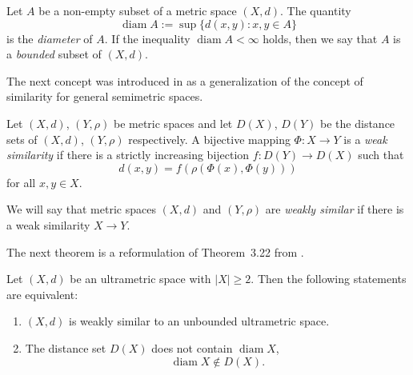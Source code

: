 \documentclass{article}
\begin{document}
Let $A$ be a non-empty subset of a metric space $(X,d)$. The quantity
\begin{equation}\label{lokias}
    \operatorname{diam} A := \sup\{ d(x,y) : x,y \in A \}
\end{equation}
is the \emph{diameter} of $A$. If the inequality $\operatorname{diam} A < \infty$
holds, then we say that $A$ is a \emph{bounded} subset of $(X,d)$.





The next concept was introduced in \cite{DP2013AMH} as a generalization of the concept of similarity for general semimetric spaces.


\begin{Definition}\label{xzsdd}
\label{scguite}
Let $(X, d)$, $(Y, \rho)$ be metric spaces and let $D(X)$, $D(Y)$ be the distance sets of $(X, d)$, $(Y, \rho)$ respectively.
 A bijective mapping $\Phi\colon X \to Y$ is a {\it weak similarity} if there is a strictly increasing bijection $f\colon D(Y) \to D(X)$ such that 
\begin{equation*}
d(x, y) = f \left( \rho \left( \Phi(x), \Phi(y) \right) \right)
\end{equation*}
for all $x, y \in X$.
\end{Definition}


We will say that metric spaces $(X,d)$ and $(Y,\rho)$ are \emph{weakly similar} if there is a weak similarity $
X \to Y $.



The next theorem is a reformulation of Theorem~3.22 from \cite{BDK2022TAG}.



\begin{Theorem}\label{rgjkjs24}
Let $(X,d)$ be an ultrametric space with $|X|\geq 2.$ Then the following statements are equivalent:
 \begin{enumerate}[label=\textit{(\roman*)}, left=0pt]
     \item $ (X,d)$ is weakly similar to an unbounded ultrametric space.
 \item The distance set $D(X)$ does not contain $\operatorname{diam} X$, 
 \begin{equation*}
     \operatorname{diam} X \notin D(X).
 \end{equation*}
 \end{enumerate}
\end{Theorem}
\end{document}

